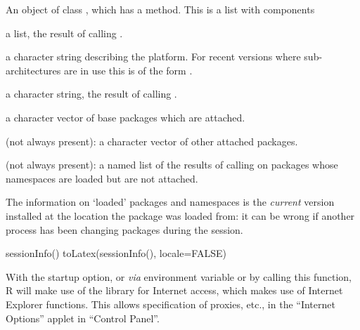 \begin{Value}
An object of class , which has a 
method. This is a list with components
\begin{ldescription}
\item[\code{R.version}] a list, the result of calling .
\item[\code{platform}] a character string describing the platform.  For recent
versions where sub-architectures are in use this is of the form
.
\item[\code{locale}] a character string, the result of calling
.
\item[\code{basePkgs}] a character vector of base packages which are attached.
\item[\code{otherPkgs}] (not always present): a character vector of other
attached packages.
\item[\code{loadedOnly}] (not always present): a named list of the results of
calling  on packages whose
namespaces are loaded but are not attached.
\end{ldescription}
\end{Value}
%
\begin{Note}\relax
The information on `loaded' packages and namespaces is the
\emph{current} version installed at the location the package was
loaded from: it can be wrong if another process has been changing
packages during the session.
\end{Note}
%
\begin{SeeAlso}\relax
{}
\end{SeeAlso}
%
\begin{Examples}
\begin{ExampleCode}

sessionInfo()
toLatex(sessionInfo(), locale=FALSE)
\end{ExampleCode}
\end{Examples}
%
\begin{Description}\relax
With the  startup option, or \emph{via}
environment variable  or by calling this
function, R will make use of the  library for
Internet access, which makes use of Internet Explorer functions.  This
allows specification of proxies, etc., in the ``Internet
Options'' applet in ``Control Panel''.
\end{Description}
